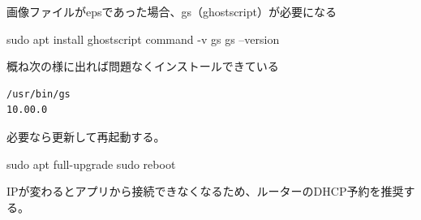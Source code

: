 \documentclass[uplatex,a4paper,11pt]{jsarticle}
\begin{document}

画像ファイルがepsであった場合、gs（ghostscript）が必要になる
\begin{command}
sudo apt install ghostscript
command -v gs
gs --version
\end{command}

概ね次の様に出れば問題なくインストールできている
\begin{verbatim}
/usr/bin/gs
10.00.0
\end{verbatim}

必要なら更新して再起動する。
\begin{command}
sudo apt full-upgrade
sudo reboot
\end{command}
IPが変わるとアプリから接続できなくなるため、ルーターのDHCP予約を推奨する。
\end{document}
